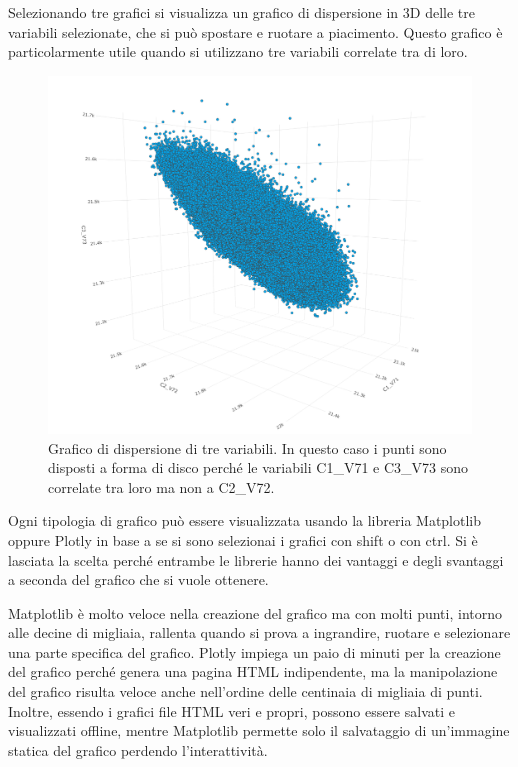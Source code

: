Selezionando tre grafici si visualizza un grafico di dispersione in 3D delle tre variabili selezionate, che si può spostare e ruotare a piacimento. Questo grafico è particolarmente utile quando si utilizzano tre variabili correlate tra di loro.

\begin{figure}[H]
	\includegraphics[width=\textwidth]{figures/3Dscatter}
	\caption[Grafico di dispersione di tre variabili]{ Grafico di dispersione di tre variabili. In questo caso i punti sono disposti a forma di disco perché le variabili C1\_V71 e C3\_V73 sono correlate tra loro ma non a C2\_V72.
		\label{fig:3Dscatter}}
\end{figure}

Ogni tipologia di grafico può essere visualizzata usando la libreria Matplotlib oppure Plotly in base a se si sono selezionai i grafici con shift o con ctrl. Si è lasciata la scelta perché entrambe le librerie hanno dei vantaggi e degli svantaggi a seconda del grafico che si vuole ottenere.

Matplotlib è molto veloce nella creazione del grafico ma con molti punti, intorno alle decine di migliaia, rallenta quando si prova a ingrandire, ruotare e selezionare una parte specifica del grafico.
Plotly impiega un paio di minuti per la creazione del grafico perché genera una pagina HTML indipendente, ma la manipolazione del grafico risulta veloce anche nell'ordine delle centinaia di migliaia di punti. Inoltre, essendo i grafici file HTML veri e propri, possono essere salvati e visualizzati offline, mentre Matplotlib permette solo il salvataggio di un'immagine statica del grafico perdendo l'interattività.


